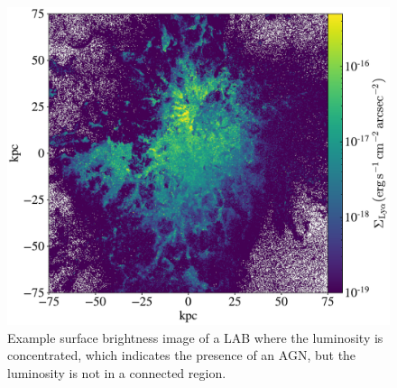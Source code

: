 
\begin{figure}
  \centering
    \includegraphics[width=\textwidth,height=\textheight,keepaspectratio]{figures/141.pdf}
  \caption{Example surface brightness image of a LAB where the luminosity is concentrated, which indicates the presence of an AGN, but the luminosity is not in a connected region.}
  \label{fig:agn_on_example}
\end{figure}

